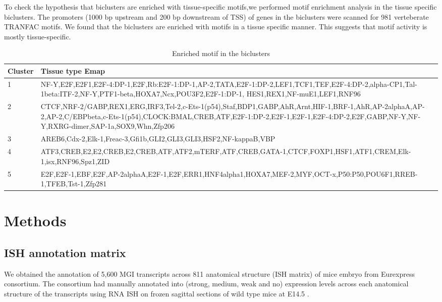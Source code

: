 \documentclass{article}
\begin{document}
To check the hypothesis that biclusters are enriched with tissue-specific motifs,we performed motif enrichment analysis in the tissue specific biclusters.
 The promoters (1000 bp upstream and 200 bp downstream of TSS) of genes in the biclusters 
were scanned for 981 verteberate TRANFAC motifs. We found that the biclusters are enriched with motifs in a tissue specific manner. 
This suggests that motif activity is mostly 
tissue-specific. 
\begin{table}
\begin{adjustwidth}{-1in}{-1in}%
	\begin{tabular}{p{1cm}p{15cm}}
\hline
Cluster&Tissue type Emap\\
\hline
1&NF-Y,E2F,E2F1,E2F-4:DP-1,E2F,Rb:E2F-1:DP-1,AP-2,TATA,E2F-1:DP-2,LEF1,TCF1,TEF,E2F-4:DP-2,alpha-CP1,Tal-1beta:ITF-2,NF-Y,PTF1-beta,HOXA7,Ncx,POU3F2,E2F-1:DP-1, HES1,REX1,NF-muE1,LEF1,RNF96\\
2&CTCF,NRF-2/GABP,REX1,ERG,IRF3,Tel-2,c-Ets-1(p54),Staf,BDP1,GABP,AhR,Arnt,HIF-1,BRF-1,AhR,AP-2alphaA,AP-2,AP-2,C/EBPbeta,c-Ets-1(p54),CLOCK:BMAL,CREB,ATF,E2F-1:DP-2,E2F-1,E2F-1,E2F-4:DP-2,E2F,GABP,NF-Y,NF-Y,RXRG-dimer,SAP-1a,SOX9,Whn,Zfp206\\
3&AREB6,Cdx-2,Elk-1,Freac-3,Gfi1b,GLI2,GLI3,GLI3,HSF2,NF-kappaB,VBP\\
4&ATF3,CREB,E2,E2,CREB,E2,CREB,ATF,ATF2,mTERF,ATF,CREB,GATA-1,CTCF,FOXP1,HSF1,ATF1,CREM,Elk-1,isx,RNF96,Spz1,ZID\\
5&E2F,E2F-1,EBF,E2F,AP-2alphaA,E2F-1,E2F,ERR1,HNF4alpha1,HOXA7,MEF-2,MYF,OCT-x,P50:P50,POU6F1,RREB-1,TFEB,Tst-1,Zfp281\\
\hline
\end{tabular}
\end{adjustwidth}
\caption{Enriched motif in the biclusters}
\label{tab:motif}
\end{table}



\section{Methods}
\subsection{ISH annotation matrix}
We obtained the annotation of 5,600 MGI transcripts across 811 anatomical structure (ISH matrix) of mice 
embryo from Eurexpress consortium. The consortium had manually annotated into (strong, medium, weak and no) 
expression levels across each anatomical structure of the transcripts using RNA ISH on frozen sagittal 
sections of wild type mice at E14.5 \cite{Diez-Roux2011a}. 
\end{document}
